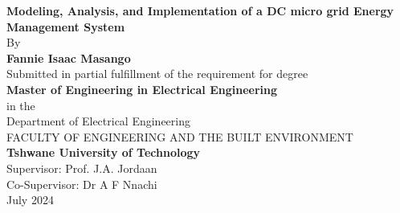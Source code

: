 \begin{titlepage}
	\centering
		\vspace*{1cm}	
			
		{\Large \textbf{Modeling, Analysis, and Implementation of a DC micro grid Energy Management System}	}
		\vspace{0.5cm}	
		\\By\\	
		\vspace{0.5cm}
		\textbf{Fannie Isaac Masango\\}
		\vspace{2cm}		
		Submitted in partial fulfillment of the requirement for degree\\
		\textbf{Master of Engineering in Electrical Engineering\\}
		\vspace{0.8cm}
		in the\\	
		Department of Electrical Engineering\\
		\vspace{1.5cm}
		FACULTY OF ENGINEERING AND THE BUILT ENVIRONMENT\\	
		\textbf{Tshwane University of Technology\\}
		\vspace{1.5cm}
		Supervisor: Prof. J.A. Jordaan\\
		Co-Supervisor: Dr A F Nnachi\\
		\vspace{2.5cm}
		July 2024
\end{titlepage} 		%